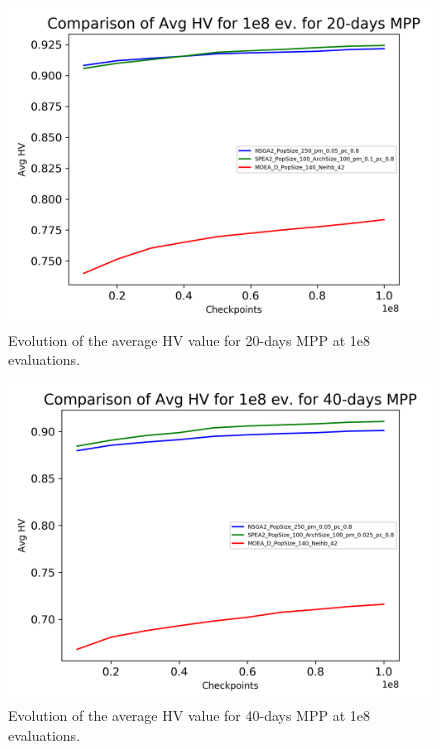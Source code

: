 \begin{figure}[H]
  \centering
  \includegraphics[width=1.0\linewidth]{../experiments/plots/avg_evolution_20_days.png}
\caption{Evolution of the average HV value for 20-days MPP at 1e8 evaluations.}
\label{fig:previous_HV_20}
\end{figure}

\begin{figure}[H]
  \centering
  \includegraphics[width=1.0\linewidth]{../experiments/plots/avg_evolution_40_days.png}
\caption{Evolution of the average HV value for 40-days MPP at 1e8 evaluations.}
\label{fig:previous_HV_40}
\end{figure}



